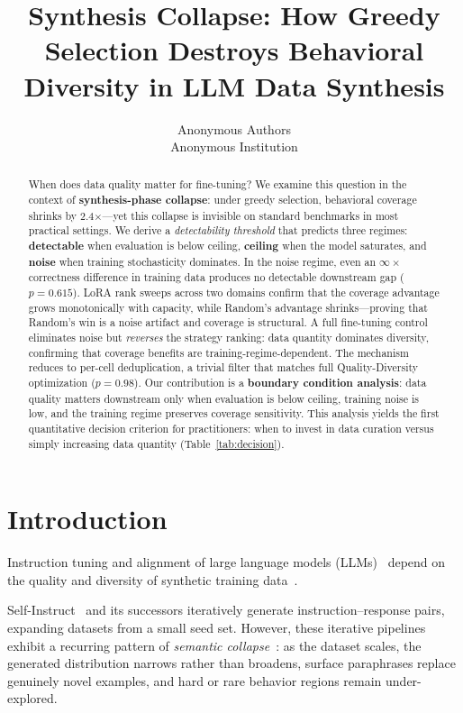 \documentclass{article}
\title{
    Synthesis Collapse: How Greedy Selection Destroys Behavioral Diversity in LLM Data Synthesis
}
\author{
  Anonymous Authors \\
  Anonymous Institution
}
\theoremstyle{plain}
\theoremstyle{remark}
\begin{document}
\maketitle

\begin{abstract}

When does data quality matter for fine-tuning?
We examine this question in the context of \textbf{synthesis-phase collapse}: under greedy selection, behavioral coverage shrinks by 2.4$\times$---yet this collapse is invisible on standard benchmarks in most practical settings.
We derive a \emph{detectability threshold} that predicts three regimes: \textbf{detectable} when evaluation is below ceiling, \textbf{ceiling} when the model saturates, and \textbf{noise} when training stochasticity dominates.
In the noise regime, even an $\infty\times$ correctness difference in training data produces no detectable downstream gap ($p{=}0.615$).
LoRA rank sweeps across two domains confirm that the coverage advantage grows monotonically with capacity, while Random's advantage shrinks---proving that Random's win is a noise artifact and coverage is structural.
A full fine-tuning control eliminates noise but \emph{reverses} the strategy ranking: data quantity dominates diversity, confirming that coverage benefits are training-regime-dependent.
The mechanism reduces to per-cell deduplication, a trivial filter that matches full Quality-Diversity optimization ($p{=}0.98$).
Our contribution is a \textbf{boundary condition analysis}: data quality matters downstream only when evaluation is below ceiling, training noise is low, and the training regime preserves coverage sensitivity.
This analysis yields the first quantitative decision criterion for practitioners: when to invest in data curation versus simply increasing data quantity (Table~\ref{tab:decision}).

\end{abstract}

\section{Introduction}
\label{sec:intro}

Instruction tuning and alignment of large language models (LLMs)~\citep{zhao2024survey_alignment, touvron2023llama} depend on the quality and diversity of synthetic training data~\citep{self_instruct_2023, evol_instruct_2023, alpaca_2023}.

Self-Instruct~\citep{self_instruct_2023} and its successors iteratively generate instruction--response pairs, expanding datasets from a small seed set.
However, these iterative pipelines exhibit a recurring pattern of \emph{semantic collapse}~\citep{model_collapse_2023, data_collapse_2024}: as the dataset scales, the generated distribution narrows rather than broadens, surface paraphrases replace genuinely novel examples, and hard or rare behavior regions remain under-explored.
\end{document}
